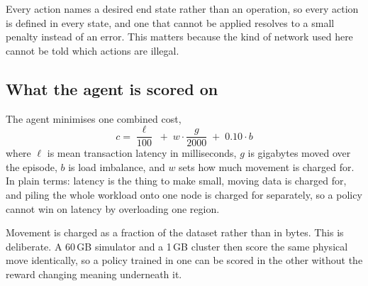 Every action names a desired end state rather than an operation, so every
action is defined in every state, and one that cannot be applied resolves to a
small penalty instead of an error. This matters because the kind of network
used here cannot be told which actions are illegal.

\subsection{What the agent is scored on}

The agent minimises one combined cost,
%
\begin{equation}
c = \frac{\ell}{100} \;+\; w \cdot \frac{g}{2000} \;+\; 0.10 \cdot b
\label{eq:objective}
\end{equation}
%
where $\ell$ is mean transaction latency in milliseconds, $g$ is gigabytes
moved over the episode, $b$ is load imbalance, and $w$ sets how much movement
is charged for. In plain terms: latency is the thing to make small, moving
data is charged for, and piling the whole workload onto one node is charged
for separately, so a policy cannot win on latency by overloading one region.

Movement is charged as a fraction of the dataset rather than in bytes. This is
deliberate. A 60\,GB simulator and a 1\,GB cluster then score the same
physical move identically, so a policy trained in one can be scored in the
other without the reward changing meaning underneath it.
